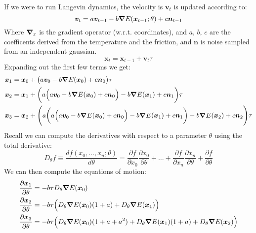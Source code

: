 \documentclass{article}
\begin{document}
If we were to run Langevin dynamics, the velocity is $\bm{v}_t$ is updated according to:
\begin{equation}
\bm{v}_t = a \bm{v}_{t-1} - b \grad  E(\bm{x}_{t-1};\theta) + c \bm{n}_{t-1}
\end{equation}
Where $\grad_x $ is the gradient operator (w.r.t. coordinates), and $a$, $b$, $c$ are the coefficents derived from the temperature and the friction, and $\bm{n}$ is noise sampled from an independent gaussian.
\begin{equation}
\bm{x}_{t} = \bm{x}_{t-1} + \bm{v}_{t} \tau
\end{equation}
Expanding out the first few terms we get:
\begin{equation}
\begin{split}
\bm{x}_1  &= \bm{x}_0 + \big(a \bm{v}_0 - b \grad  E(\bm{x}_0) + c \bm{n}_0  \big) \tau \\
\bm{x}_2  &= \bm{x}_1 + \bigg( a \Big( a \bm{v}_0 - b \grad  E(\bm{x}_0) + c \bm{n}_0 \Big) - b \grad  E(\bm{x}_1) + c \bm{n}_1 \bigg) \tau \\
\bm{x}_3  &= \bm{x}_2 + \Bigg(a\bigg(a \Big( a \bm{v}_0 - b \grad  E(\bm{x}_0) + c \bm{n}_0 \Big) - b \grad  E(\bm{x}_1) + c \bm{n}_1 \bigg) - b \grad  E(\bm{x}_2) + c \bm{n}_2 \Bigg) \tau \\
\end{split}
\end{equation}
Recall we can compute the derivatives with respect to a parameter $\theta$ using the total derivative:
\begin{equation}
D_{\theta}f \equiv \dfrac{df( x_0, \ldots, x_n ;\theta)}{d\theta} = \dfrac{\partial f}{\partial x_0} \dfrac{\partial x_0} {\partial\theta} + \ldots + \dfrac{\partial f}{\partial x_n}\dfrac{\partial x_n}{\partial\theta} + \dfrac{\partial f}{\partial \theta}
\end{equation}
We can then compute the equations of motion:
\begin{equation}
\begin{split}
\dfrac{\partial\bm{x}_1}{\partial\theta}  &= - b\tau D_{\theta} \grad E(\bm{x}_0) \\
\dfrac{\partial\bm{x}_2}{\partial\theta}  &= - b\tau \Big(D_{\theta} \grad E(\bm{x}_0)(1+a)+D_{\theta} \grad E(\bm{x}_1)\Big)\\
\dfrac{\partial\bm{x}_3}{\partial\theta}  &= - b\tau \Big(D_{\theta} \grad E(\bm{x}_0)(1+a+a^2)+D_{\theta} \grad E(\bm{x}_1)(1+a)+D_{\theta} \grad E(\bm{x}_2)\Big)\\
\end{split}
\end{equation}
\end{document}
